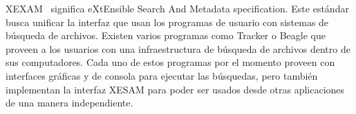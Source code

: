XEXAM~\cite{xesam:website} significa eXtEnsible Search And Metadata specification. Este estándar busca unificar la interfaz que usan los programas de usuario con sistemas de búsqueda de archivos. Existen varios programas como Tracker o Beagle que proveen a los usuarios con una infraestructura de búsqueda de archivos dentro de sus computadores. Cada uno de estos programas por el momento proveen con interfaces gráficas y de consola para ejecutar las búsquedas, pero también implementan la interfaz XESAM para poder ser usados desde otras aplicaciones de una manera independiente.



